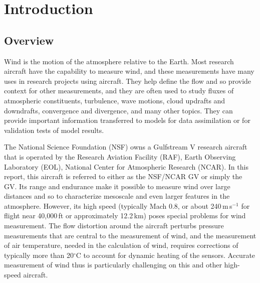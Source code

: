 \documentclass[12pt,twoside,english]{article}\usepackage[]{graphicx}\usepackage[]{color}
\let\stdsection\section
\renewcommand{\section}{\newpage\stdsection}
\let\OrgIndex\index
\renewcommand*{\index}[1]{\OrgIndex{#1}}
\begin{document}



\section{Introduction}

\subsection{Overview}

Wind is the motion of the atmosphere relative to the Earth. Most research aircraft have the capability to measure wind, and these measurements have many uses in research projects using aircraft. They help define the flow and so provide context for other measurements, and they are often used to study fluxes of atmospheric constituents, turbulence, wave motions, cloud updrafts and downdrafts, convergence and divergence, and many other topics. They can provide important information transferred to models for data assimilation or for validation tests of model results. 


The National Science Foundation (NSF) owns a Gulfstream V research aircraft that is operated by the Research Aviation Facility (RAF), Earth Observing Laboratory (EOL), National Center for Atmospheric Research (NCAR). In this report, this aircraft is referred to either as the NSF/NCAR GV or simply the GV. Its range and endurance make it possible to measure wind over large distances and so to characterize mesoscale and even larger features in the atmosphere. However, its high speed (typically Mach 0.8, or about 240\,m\,s$^{-1}$ for flight near 40,000\,ft or approximately 12.2\,km) poses special problems for wind measurement. The flow distortion around the aircraft perturbs pressure measurements that are central to the measurement of wind, and the measurement of air temperature, needed in the calculation of wind, requires corrections of typically more than 20$^{\circ}$C to account for dynamic heating of the sensors. Accurate measurement of wind thus is particularly challenging on this and other high-speed aircraft. 
\end{document}
